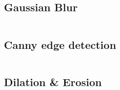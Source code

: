 \documentclass[a4paper, 10pt]{article}
\begin{document}
\begin{lstlisting}[language = C++]

\end{lstlisting}


\subsection{Gaussian Blur}

%

\begin{lstlisting}[language = C++]

\end{lstlisting}


\subsection{Canny edge detection}

% 

\begin{lstlisting}[language = C++]

\end{lstlisting}


\subsection{Dilation \& Erosion}
\end{document}
